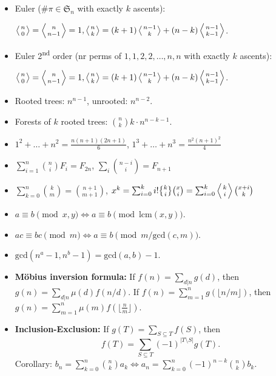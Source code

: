 \documentclass[8pt,a4paper,landscape,oneside]{amsart}
\DeclareRobustCommand{\stirling}{\genfrac\{\}{0pt}{}}
\begin{document}
\begin{multicols*}{3}
\begin{itemize}[wide,labelwidth=!,labelindent=0pt]
	\item Euler ($\# \pi \in \mathfrak{S}_n$ with exactly $k$ ascents):

		$\left \langle {n\atop 0} \right \rangle = \left \langle {n\atop n-1} \right \rangle = 1, \left \langle {n\atop k} \right \rangle = (k+1) \left \langle {n-1\atop {k}} \right \rangle + (n-k)\left \langle {{n-1}\atop {k-1}} \right \rangle$.

	\item Euler 2\textsuperscript{nd} order (nr perms of ${1, 1, 2, 2, \dots, n, n}$ with exactly $k$ ascents):

		$\left \langle {n\atop 0} \right \rangle = \left \langle {n\atop n-1} \right \rangle = 1, \left \langle {n\atop k} \right \rangle = (k+1) \left \langle {n-1\atop {k}} \right \rangle + (n-k)\left \langle {{n-1}\atop {k-1}} \right \rangle$.

	\item Rooted trees: $n^{n-1}$, unrooted: $n^{n-2}$.
	\item Forests of $k$ rooted trees: $\binom{n}{k} k \cdot n^{n-k-1}$.
	\item $1^2 + \dots + n^2 = \frac{n(n+1)(2n+1)}{6}$, \quad $1^3 + \dots + n^3 = \frac{n^2(n+1)^2}{4}$ \\
	\item $\sum_{i=1}^n \binom{n}{i} F_i = F_{2n}$, \quad $\sum_{i} \binom{n-i}{i} = F_{n+1}$
	\item $\sum_{k=0}^n \binom{k}{m} = \binom{n+1}{m+1}$, \quad $x^k = \sum_{i=0}^k i!\stirling{k}{i}\binom{x}{i} = \sum_{i=0}^k \left\langle {k \atop i} \right\rangle\binom{x+i}{k}$
	\item $a\equiv b \pmod{x,y} \Leftrightarrow a \equiv b \pmod{\mathrm{lcm}(x,y)}$.
	\item $ac \equiv bc \pmod{m} \Leftrightarrow a \equiv b \pmod{m/\mathrm{gcd}(c,m)}$.
	\item $\mathrm{gcd}(n^a-1,n^b-1) = \mathrm{gcd}(a,b)-1$.
	\item \textbf{Möbius inversion formula:} If $f(n) = \sum_{d|n} g(d)$, then $g(n) = \sum_{d|n} \mu(d) f(n/d)$. If $f(n) = \sum_{m=1}^n g(\lfloor n/m\rfloor)$, then $g(n) = \sum_{m=1}^n \mu(m)f(\lfloor\frac{n}{m}\rfloor)$.
	\item \textbf{Inclusion-Exclusion:} If $g(T) = \sum_{S \subseteq T} f(S)$, then
	\[
		f(T) = \sum_{S \subseteq T} (-1)^{\lvert T \setminus S \rvert} g(T).
	\]
	Corollary:
		$b_n = \sum_{k=0}^{n} \binom{n}{k} a_k \Longleftrightarrow a_n = \sum_{k=0}^{n} (-1)^{n-k} \binom{n}{k} b_k$.
\end{itemize}


\end{multicols*}
\end{document}
